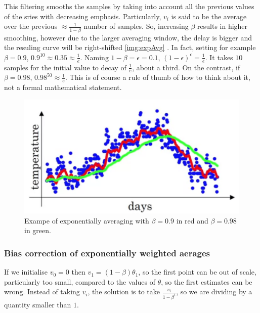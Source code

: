 This filtering smooths the samples by taking into account all the previous values of the sries with decreasing emphasis. Particularly, $v_i$ is said to be the average over the previous $\approx \frac{1}{1-\beta}$ number of samples. So, increasing $\beta$ results in higher smoothing, however due to the larger averaging window, the delay is bigger and the resuling curve will be right-shifted \autoref{img:expAvg}	. In fact, setting for example $\beta=0.9$, $0.9^{10}\approx 0.35 \approx \frac{1}{e}$. Naming $1-\beta=\epsilon=0.1$, $(1-\epsilon)^\epsilon=\frac{1}{e}$. It takes $10$ samples for the initial value to decay of $\frac{1}{e}$, about a third. On the contrast, if $\beta=0.98$, $0.98^{50}\approx \frac{1}{e}$. This is of course a rule of thumb of how to think about it, not a formal mathematical statement.	

\begin{figure}
\centering
\includegraphics[scale=0.3]{img/expAvg}
\caption{Exampe of exponentially averaging with $\beta=0.9$ in red and $\beta=0.98$ in green.}
\label{img:expAg}
\end{figure}

\subsubsection{Bias correction of exponentially weighted aerages}
If we initialise $v_0=0$ then $v_1= (1-\beta) \theta_1$, so the first point can be out of scale, particularly too small, compared to the values of $\theta$, so the first estimates can be wrong. Instead of taking $v_i$, the solution is to take $\frac{v_i}{1-\beta^i}$, so we are dividing by a quantity smaller than $1$.

